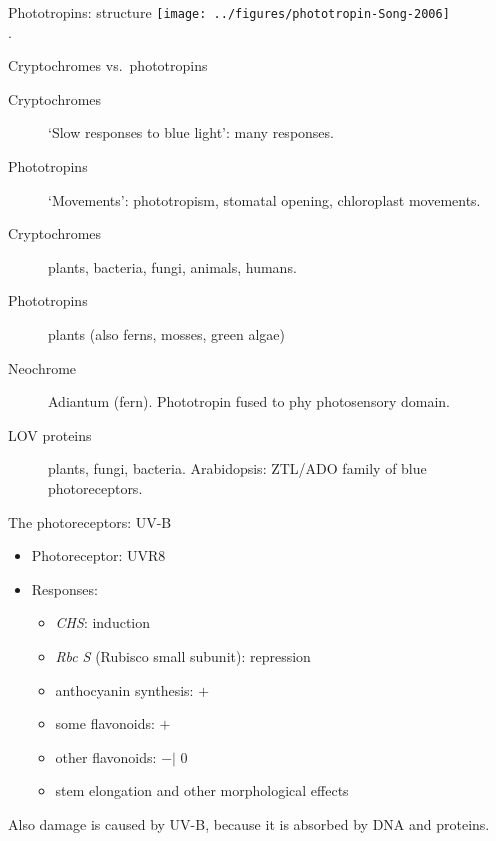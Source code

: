 \documentclass[10pt]{beamer}
\newcommand*{\nEff}{{\scriptsize 0}\xspace}
\newcommand*{\pEff}{\ensuremath{+}\xspace}
\newcommand*{\mEff}{\ensuremath{-}\xspace}
\begin{document}
\begin{frame}{Phototropins: structure}
    \centering
    \texttt{[image: ../figures/phototropin-Song-2006]}\\
    {\footnotesize \autocite[from][]{Song2006}.}
\end{frame}

\begin{frame}{Cryptochromes vs.\ phototropins}
    \begin{description}
        \item[Cryptochromes] `Slow responses to blue light': many responses.
        \item[Phototropins] `Movements': phototropism, stomatal opening, chloroplast movements.
        \item[Cryptochromes] plants, bacteria, fungi, animals, humans.
        \item[Phototropins] plants (also ferns, mosses, green algae)
        \item[Neochrome] Adiantum (fern). Phototropin fused to phy photosensory domain.
        \item[LOV proteins] plants, fungi, bacteria. Arabidopsis: ZTL/ADO family of blue photoreceptors.
    \end{description}
\end{frame}

\begin{frame}{The photoreceptors: UV-B}
    \begin{itemize}
        \item Photoreceptor: UVR8
        \item Responses:
        \begin{itemize}
            \item \textsl{CHS}: induction
            \item \textsl{Rbc S} (Rubisco small subunit): repression
            \item anthocyanin synthesis: \pEff
            \item some flavonoids: \pEff
            \item other flavonoids: \mEff $|$ \nEff
            \item stem elongation and other morphological effects
        \end{itemize}
    \end{itemize}

    Also damage is caused by UV-B, because it is absorbed
    by DNA and proteins.
\end{frame}
\end{document}
